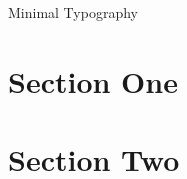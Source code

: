 \documentclass[12pt]{article}
\begin{document}
\begin{center}
    {\Huge Minimal Typography}
\end{center}

\vspace{3cm}

\section*{Section One}
\lipsum[1]

\section*{Section Two}
\lipsum[2]
\end{document}
